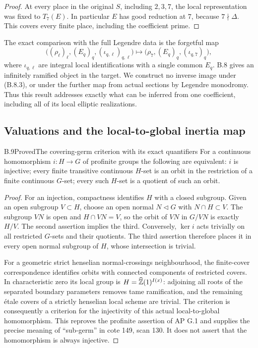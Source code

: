 \begin{proof}
At every place in the original $S$, including $2,3,7$, the local
representation was fixed to $T_7(E)$.  In particular $E$ has good
reduction at $7$, because $7\nmid\Delta$.  This covers every
finite place, including the coefficient prime.
\end{proof}

The exact comparison with the full Legendre data is the forgetful map
\[
 \bigl((\rho_\ell)_\ell,(E_q)_q,(\iota_{q,\ell})_{q,\ell}\bigr)
 \longmapsto\bigl(\rho_7,(E_q)_q,(\iota_{q,7})_q\bigr),          \tag{B.8.3}
\]
where $\iota_{q,\ell}$ are integral local identifications with a
single common $E_q$.  B.8 gives an infinitely ramified object in
the target.  We construct no inverse image under (B.8.3), or under
the further map from actual sections by Legendre monodromy.
Thus this result addresses exactly what can be inferred from one
coefficient, including all of its local elliptic realizations.

\subsection{Valuations and the local-to-global inertia map}

\begin{statement}{B.9}{Proved}{The covering-germ criterion with its exact quantifiers}
For a continuous homomorphism $i:H\to G$ of profinite groups the
following are equivalent: $i$ is injective; every finite transitive
continuous $H$-set is an orbit in the restriction of a finite
continuous $G$-set; every such $H$-set is a quotient of such an orbit.
\end{statement}
\begin{proof}
For an injection, compactness identifies $H$ with a closed subgroup.
Given an open subgroup $V\subset H$, choose an open normal
$N\triangleleft G$ with $N\cap H\subset V$.  The subgroup $VN$
is open and $H\cap VN=V$, so the orbit of $VN$ in $G/VN$ is
exactly $H/V$.  The second assertion implies the third.  Conversely,
$\ker i$ acts trivially on all restricted $G$-sets and their
quotients.  The third assertion therefore places it in every open
normal subgroup of $H$, whose intersection is trivial.

For a geometric strict henselian normal-crossings neighbourhood,
the finite-cover correspondence identifies orbits with connected
components of restricted covers.  In characteristic zero its local
group is $H=\widehat{\mathbb Z}(1)^{I(x)}$: adjoining all roots of the
separated boundary parameters removes tame ramification, and the
remaining \'etale covers of a strictly henselian local scheme are
trivial.  The criterion is consequently a criterion for the
injectivity of this actual local-to-global homomorphism.  This
reproves the profinite assertion of AP G.1 and supplies the precise
meaning of ``sub-germ'' in cote 149, scan 130.  It does not assert
that the homomorphism is always injective.
\end{proof}

